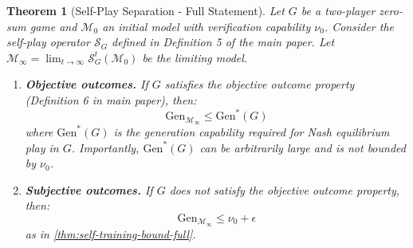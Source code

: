 \documentclass{article}
\newtheorem{theorem}{Theorem}
\theoremstyle{definition}
\theoremstyle{remark}
\newcommand{\M}{\mathcal{M}}
\newcommand{\Gen}{\text{Gen}}
\begin{document}
\begin{theorem}[Self-Play Separation - Full Statement]
\label{thm:self-play-separation-full}
Let \(G\) be a two-player zero-sum game and \(\M_0\) an initial model with verification capability \(\nu_0\). Consider the self-play operator \(\mathcal{S}_G\) defined in Definition 5 of the main paper. Let \(\M_\infty = \lim_{t \to \infty} \mathcal{S}_G^t(\M_0)\) be the limiting model.

\begin{enumerate}
\item \textbf{Objective outcomes.} If \(G\) satisfies the objective outcome property (Definition 6 in main paper), then:
\[
\Gen_{\M_\infty} \leq \Gen^*(G)
\]
where \(\Gen^*(G)\) is the generation capability required for Nash equilibrium play in \(G\). Importantly, \(\Gen^*(G)\) can be arbitrarily large and is not bounded by \(\nu_0\).

\item \textbf{Subjective outcomes.} If \(G\) does not satisfy the objective outcome property, then:
\[
\Gen_{\M_\infty} \leq \nu_0 + \epsilon
\]
as in \cref{thm:self-training-bound-full}.
\end{enumerate}
\end{theorem}
\end{document}
